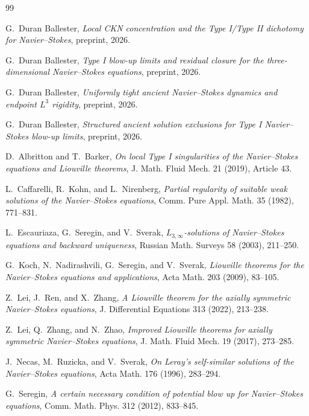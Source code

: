 \documentclass[11pt]{amsart}
\numberwithin{equation}{section}
\theoremstyle{plain}
\theoremstyle{definition}
\theoremstyle{remark}
\begin{document}
\begin{thebibliography}{99}

G.~Duran Ballester,
\emph{Local CKN concentration and the Type I/Type II dichotomy for
Navier--Stokes},
preprint, 2026.

G.~Duran Ballester,
\emph{Type I blow-up limits and residual closure for the
three-dimensional Navier--Stokes equations},
preprint, 2026.

G.~Duran Ballester,
\emph{Uniformly tight ancient Navier--Stokes dynamics and endpoint \(L^3\)
rigidity},
preprint, 2026.

G.~Duran Ballester,
\emph{Structured ancient solution exclusions for Type I Navier--Stokes blow-up
limits},
preprint, 2026.

D.~Albritton and T.~Barker,
\emph{On local Type I singularities of the Navier--Stokes equations and
Liouville theorems},
J. Math. Fluid Mech. 21 (2019), Article 43.

L.~Caffarelli, R.~Kohn, and L.~Nirenberg,
\emph{Partial regularity of suitable weak solutions of the Navier--Stokes
equations},
Comm. Pure Appl. Math. 35 (1982), 771--831.

L.~Escauriaza, G.~Seregin, and V.~Sverak,
\emph{\(L_{3,\infty}\)-solutions of Navier--Stokes equations and backward
uniqueness},
Russian Math. Surveys 58 (2003), 211--250.

G.~Koch, N.~Nadirashvili, G.~Seregin, and V.~Sverak,
\emph{Liouville theorems for the Navier--Stokes equations and applications},
Acta Math. 203 (2009), 83--105.

Z.~Lei, J.~Ren, and X.~Zhang,
\emph{A Liouville theorem for the axially symmetric Navier--Stokes equations},
J. Differential Equations 313 (2022), 213--238.

Z.~Lei, Q.~Zhang, and N.~Zhao,
\emph{Improved Liouville theorems for axially symmetric Navier--Stokes
equations},
J. Math. Fluid Mech. 19 (2017), 273--285.

J.~Necas, M.~Ruzicka, and V.~Sverak,
\emph{On Leray's self-similar solutions of the Navier--Stokes equations},
Acta Math. 176 (1996), 283--294.

G.~Seregin,
\emph{A certain necessary condition of potential blow up for Navier--Stokes
equations},
Comm. Math. Phys. 312 (2012), 833--845.

\end{thebibliography}
\end{document}
